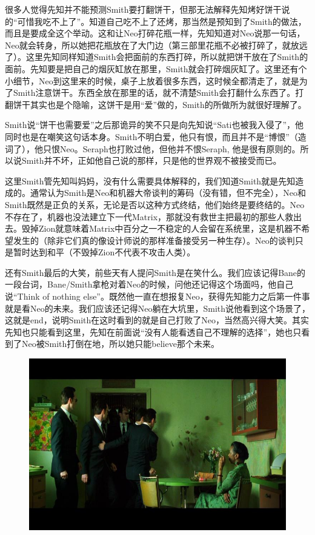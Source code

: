 \documentclass[UTF8]{ctexart}
\begin{document}
很多人觉得先知并不能预测Smith要打翻饼干，但那无法解释先知烤好饼干说的“可惜我吃不上了”。知道自己吃不上了还烤，那当然是预知到了Smith的做法，而且是要成全这个举动。这和让Neo打碎花瓶一样，先知知道对Neo说那一句话，Neo就会转身，所以她把花瓶放在了大门边（第三部里花瓶不必被打碎了，就放远了）。这里先知同样知道Smith会把面前的东西打碎，所以就把饼干放在了Smith的面前。先知要是把自己的烟灰缸放在那里，Smith就会打碎烟灰缸了。这里还有个小细节，Neo到这里来的时候，桌子上放着很多东西，这时候全都清走了，就是为了Smith注意饼干。东西全放在那里的话，就不清楚Smith会打翻什么东西了。打翻饼干其实也是个隐喻，这饼干是用“爱”做的，Smith的所做所为就很好理解了。

Smith说“饼干也需要爱”之后那诡异的笑不只是向先知说“Sati也被我入侵了”，他同时也是在嘲笑这句话本身。Smith不明白爱，他只有恨，而且并不是“博恨”（造词了），他只恨Neo。Seraph也打败过他，但他并不恨Seraph, 他是很有原则的。所以说Smith并不坏，正如他自己说的那样，只是他的世界观不被接受而已。

这里Smith管先知叫妈妈，没有什么需要具体解释的，我们知道Smith就是先知造成的。通常认为Smith是Neo和机器大帝谈判的筹码（没有错，但不完全），Neo和Smith既然是正负的关系，无论是否以这种方式终结，他们始终是要终结的。Neo不存在了，机器也没法建立下一代Matrix，那就没有救世主把最初的那些人救出去。毁掉Zion就意味着Matrix中百分之一不稳定的人会留在系统里，这是机器不希望发生的（除非它们真的像设计师说的那样准备接受另一种生存）。Neo的谈判只是暂时达到和平（不毁掉Zion不代表不攻击人类）。

还有Smith最后的大笑，前些天有人提问Smith是在笑什么。我们应该记得Bane的一段台词，Bane/Smith拿枪对着Neo的时候，问他还记得这个场面吗，他自己说“Think of nothing else”。既然他一直在想报复Neo，获得先知能力之后第一件事就是看Neo的未来。我们应该还记得Neo躺在大坑里，Smith说他看到这个场景了，这就是end，说明Smith在这时看到的就是自己打败了Neo，当然高兴得大笑。其实先知也只能看到这里，先知在前面说“没有人能看透自己不理解的选择”，她也只看到了Neo被Smith打倒在地，所以她只能believe那个未来。

\begin{figure}[htb]
\centering
\includegraphics[width=0.5\linewidth]{fig/45c00df489aee5ef7609d702.jpg}
\end{figure}
\end{document}
